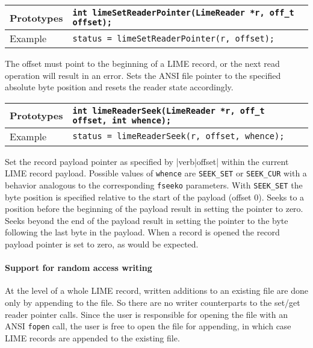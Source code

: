 \documentclass{article}
\begin{document}
%
\begin{flushleft}
  \begin{tabular}{|l|l|}
  \hline
  Prototypes     & \verb|int limeSetReaderPointer(LimeReader *r, off_t offset);| \\
\hline
  Example  & \verb|status = limeSetReaderPointer(r, offset);| \\
   \hline
 \end{tabular}
\end{flushleft}
%
The offset must point to the beginning of a LIME record, or the next
read operation will result in an error.  Sets the ANSI file pointer to
the specified absolute byte position and resets the reader state
accordingly.

%
\begin{flushleft}
  \begin{tabular}{|l|l|}
  \hline
  Prototypes     & \verb|int limeReaderSeek(LimeReader *r, off_t offset, int whence);| \\
\hline
  Example  & \verb|status = limeReaderSeek(r, offset, whence);| \\
   \hline
 \end{tabular}
\end{flushleft}
%
Set the record payload pointer as specified by |verb|offset| within
the current LIME record payload.  Possible values of \verb|whence| are
\verb|SEEK_SET| or \verb|SEEK_CUR| with a behavior analogous to the
corresponding \verb|fseeko| parameters.  With \verb|SEEK_SET| the byte
position is specified relative to the start of the payload (offset 0).
Seeks to a position before the beginning of the payload result in
setting the pointer to zero.  Seeks beyond the end of the payload
result in setting the pointer to the byte following the last byte in
the payload.  When a record is opened the record payload pointer is
set to zero, as would be expected.


\paragraph{Support for random access writing}

At the level of a whole LIME record, written additions to an existing
file are done only by appending to the file.  So there are no writer
counterparts to the set/get reader pointer calls. Since the user is
responsible for opening the file with an ANSI \verb|fopen| call, the
user is free to open the file for appending, in which case LIME
records are appended to the existing file.
\end{document}
